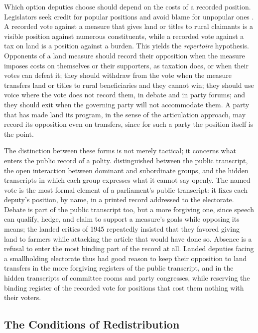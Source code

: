 \documentclass[12pt]{article}
\begin{document}
Which option deputies choose should depend on the costs of a recorded position. Legislators seek credit for popular positions and avoid blame for unpopular ones \citep{mayhew1974,weaver1986}. A recorded vote against a measure that gives land or titles to rural claimants is a visible position against numerous constituents, while a recorded vote against a tax on land is a position against a burden. This yields the \textit{repertoire} hypothesis. Opponents of a land measure should record their opposition when the measure imposes costs on themselves or their supporters, as taxation does, or when their votes can defeat it; they should withdraw from the vote when the measure transfers land or titles to rural beneficiaries and they cannot win; they should use voice where the vote does not record them, in debate and in party forums; and they should exit when the governing party will not accommodate them. A party that has made land its program, in the sense of the articulation approach, may record its opposition even on transfers, since for such a party the position itself is the point.

The distinction between these forms is not merely tactical; it concerns what enters the public record of a polity. \citet{scott1990} distinguished between the public transcript, the open interaction between dominant and subordinate groups, and the hidden transcripts in which each group expresses what it cannot say openly. The named vote is the most formal element of a parliament's public transcript: it fixes each deputy's position, by name, in a printed record addressed to the electorate. Debate is part of the public transcript too, but a more forgiving one, since speech can qualify, hedge, and claim to support a measure's goals while opposing its means; the landed critics of 1945 repeatedly insisted that they favored giving land to farmers while attacking the article that would have done so. Absence is a refusal to enter the most binding part of the record at all. Landed deputies facing a smallholding electorate thus had good reason to keep their opposition to land transfers in the more forgiving registers of the public transcript, and in the hidden transcripts of committee rooms and party congresses, while reserving the binding register of the recorded vote for positions that cost them nothing with their voters.

\subsection*{The Conditions of Redistribution}
\end{document}
